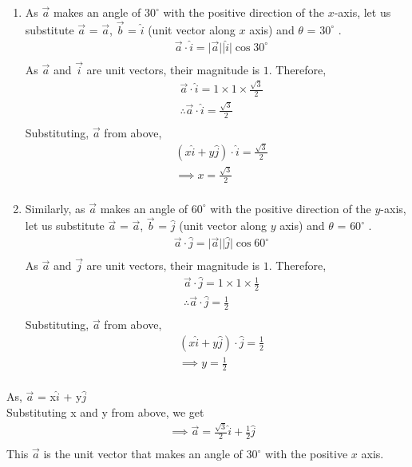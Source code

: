 \documentclass[12pt]{scrartcl}
\begin{document}
\begin{enumerate}[label=(\alph*)]
\item As $\vec{a}$ makes an angle of $30^{\circ}$ with the positive direction of the $x$-axis, let us substitute $\vec{a}$ = $\vec{a}$, $\vec{b}$ = $\hat{i}$ (unit vector along $x$ axis) and $\theta$ = $30^{\circ}$  . 
\newline 
 \begin{align*}
& \vec{a} \cdot \hat{i}  = \lvert \vec{a} \rvert \lvert \hat{i} \rvert \cos{30^{\circ}}\\
\end{align*}
As $\vec{a}$ and $\vec{i}$ are unit vectors, their magnitude is $1$. Therefore,
 \begin{align*}
& \vec{a} \cdot \hat{i}  = 1 \times 1 \times \frac{\sqrt{3}}{2}\\
&\therefore \vec{a} \cdot \hat{i}  = \frac{\sqrt{3}}{2}\\
\end{align*}
Substituting, $\vec{a}$ from above,
\begin{align*}
& \left (x\hat{i} + y\hat{j} \right) \cdot \hat{i} = \frac{\sqrt{3}}{2}\\
& \implies \boxed{x = \frac{\sqrt{3}}{2}}\\
\end{align*}


\item Similarly, as $\vec{a}$ makes an angle of $60^{\circ}$ with the positive direction of the $y$-axis, let us substitute $\vec{a}$ = $\vec{a}$, $\vec{b}$ = $\hat{j}$ (unit vector along $y$ axis) and $\theta$ = $60^{\circ}$  . 
\newline 
 \begin{align*}
& \vec{a} \cdot \hat{j}  = \lvert \vec{a} \rvert \lvert \hat{j} \rvert \cos{60^{\circ}}\\
\end{align*}
As $\vec{a}$ and $\vec{j}$ are unit vectors, their magnitude is $1$. Therefore,
 \begin{align*}
& \vec{a} \cdot \hat{j}  = 1 \times 1 \times \frac{1}{2}\\
&\therefore \vec{a} \cdot \hat{j}  = \frac{1}{2}\\
\end{align*}
Substituting, $\vec{a}$ from above,
\begin{align*}
& \left (x\hat{i} + y\hat{j} \right) \cdot \hat{j} = \frac{1}{2}\\
& \implies \boxed{y = \frac{1}{2}}\\
\end{align*}
\end{enumerate}

As,  $\vec{a}$  = x$\hat{i}$ + y$\hat{j}$\\
Substituting x and y from above, we get\\
\begin{align*}
&\implies \boxed{\vec{a}  = \frac{\sqrt{3}}{2}\hat{i} + \frac{1}{2}\hat{j}}\\
\end{align*}
This $\vec{a}$ is the unit vector that makes an angle of $30^{\circ}$ with the positive $x$ axis. 
\end{document}
